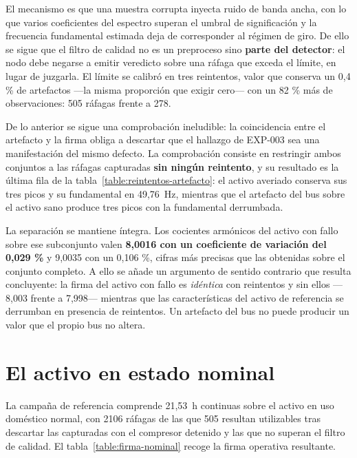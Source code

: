 El mecanismo es que una muestra corrupta inyecta ruido de banda ancha, con lo que varios
coeficientes del espectro superan el umbral de significación y la frecuencia fundamental
estimada deja de corresponder al régimen de giro. De ello se sigue que el filtro de calidad no
es un preproceso sino \textbf{parte del detector}: el nodo debe negarse a emitir veredicto sobre
una ráfaga que exceda el límite, en lugar de juzgarla. El límite se calibró en tres reintentos,
valor que conserva un 0,4 \% de artefactos —la misma proporción que exigir cero— con un 82 \%
más de observaciones: 505 ráfagas frente a 278.

De lo anterior se sigue una comprobación ineludible: la coincidencia entre el artefacto y la firma
obliga a descartar que el hallazgo de EXP-003 sea una manifestación del mismo defecto. La
comprobación consiste en restringir ambos conjuntos a las ráfagas capturadas \textbf{sin ningún
reintento}, y su resultado es la última fila de la tabla~\ref{table:reintentos-artefacto}: el activo
averiado conserva sus tres picos y su fundamental en \mbox{49,76 Hz}, mientras que el artefacto del
bus sobre el activo sano produce tres picos con la fundamental derrumbada.

La separación se mantiene íntegra. Los cocientes armónicos del activo con fallo sobre ese
subconjunto valen \textbf{8,0016 con un coeficiente de variación del 0,029 \%} y 9,0035 con un
0,106 \%, cifras más precisas que las obtenidas sobre el conjunto completo. A ello se añade un
argumento de sentido contrario que resulta concluyente: la firma del activo con fallo es
\textit{idéntica} con reintentos y sin ellos —8,003 frente a 7,998— mientras que las
características del activo de referencia se derrumban en presencia de reintentos. Un artefacto
del bus no puede producir un valor que el propio bus no altera.

\section{El activo en estado nominal}

La campaña de referencia comprende \mbox{21,53 h} continuas sobre el activo en uso doméstico
normal, con 2106 ráfagas de las que 505 resultan utilizables tras descartar las capturadas con
el compresor detenido y las que no superan el filtro de calidad. El
tabla~\ref{table:firma-nominal} recoge la firma operativa resultante.

